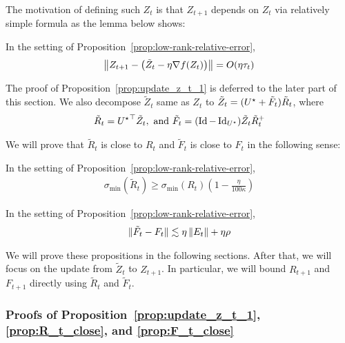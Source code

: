 The motivation of defining such $Z_t$ is that $Z_{t+1}$ depends on $Z_t$ via relatively simple formula as the lemma below shows:
\begin{prop}\label{prop:update_z_t_1}
	In the setting of Proposition~\ref{prop:low-rank-relative-error},
\begin{align}\left\|Z_{t + 1} - \left(\tilde{Z}_t - \eta \nabla f(Z_t) \right)\right\|= O(\eta \tau_t)\nonumber\end{align}
\end{prop}

\noindent The proof of Proposition~\ref{prop:update_z_t_1} is deferred to the later part of this section. We also decompose $\tilde{Z}_t$ same as $Z_t$ to $\tilde{Z}_t = ({{U}^\star} + \tilde{F}_t) \tilde{R}_t$, where 
\begin{align}
\tilde{R}_t = {{U}^\star}^\top \tilde{Z}_t, \textup{ and } \tilde{F}_t = (\operatorname{Id}- \operatorname{Id}_{{{U}^\star}})\tilde{Z}_t \tilde{R}_t^{+} \label{eqn:decompose_z_tilde}
\end{align}

\noindent We will prove that $\tilde{R}_t$ is close to $R_t$ and $\tilde{F}_t$ is close to $F_t$ in the following sense:
\begin{prop}\label{prop:R_t_close}In the setting of Proposition~\ref{prop:low-rank-relative-error},
\begin{align}
\sigma_{\min}(\tilde{R}_t ) \geq \sigma_{\min}(R_t)\left( 1 - \frac{\eta}{100 \kappa} \right)\nonumber
\end{align}
\end{prop}
\begin{prop}\label{prop:F_t_close}In the setting of Proposition~\ref{prop:low-rank-relative-error},
\begin{align}
\|\tilde{F}_t - F_t\| \lesssim \eta \left\|E_t\right\|  + \eta \rho\nonumber
\end{align}
\end{prop}

We will prove these propositions in the following sections. After that, we will focus on the update from $\tilde{Z}_t$ to $Z_{t + 1}$. In particular, we will bound $R_{t + 1} $ and $F_{t + 1}$ directly using $\tilde{R}_{t}$ and $\tilde{F}_t$.

\subsubsection{Proofs of Proposition~\ref{prop:update_z_t_1}, \ref{prop:R_t_close}, and \ref{prop:F_t_close}}


